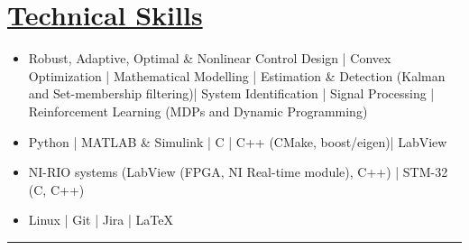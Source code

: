 \section*{\underline{Technical Skills}}
\begin{itemize}
        \item[\itbf{Control and Estimation:}] Robust, Adaptive, Optimal \& Nonlinear Control Design |
        Convex Optimization | Mathematical Modelling |
        Estimation \& Detection (Kalman and Set-membership filtering)|
        System Identification | Signal Processing |
        Reinforcement Learning (MDPs and Dynamic Programming)
        \item[\itbf{Programming:}] Python | MATLAB \& Simulink | C | C++ (CMake, boost/eigen)| LabView
        \item[\itbf{Embedded Systems:}] NI-RIO systems (LabView (FPGA, NI Real-time module), C++) | STM-32 (C, C++)
        \item[\itbf{OS \& Tools:}] Linux | Git | Jira | \LaTeX
\end{itemize}
\noindent\rule{\textwidth}{0.4pt}

